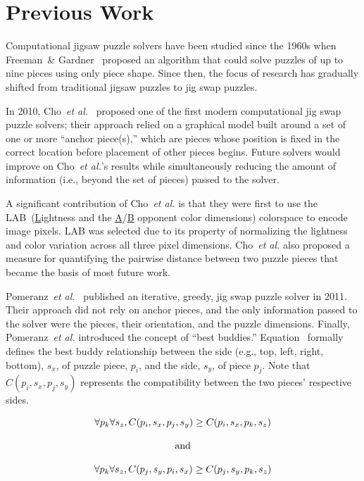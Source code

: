 \chapter{Previous Work}\label{chap:previousWork}

Computational jigsaw puzzle solvers have been studied since the 1960s when Freeman~\& Gardner~\cite{freeman1964} proposed an algorithm that could solve puzzles of up to nine pieces using only piece shape.  Since then, the focus of research has gradually shifted from traditional jigsaw puzzles to jig swap puzzles.  

In 2010, Cho~\textit{et al.}~\cite{cho2010} proposed one of the first modern computational jig swap puzzle solvers; their approach relied on a graphical model built around a set of one or more ``anchor piece(s),'' which are pieces whose position is fixed in the correct location before placement of other pieces begins.  Future solvers would improve on Cho~\textit{et al.}'s results while simultaneously reducing the amount of information (i.e., beyond the set of pieces) passed to the solver.

A significant contribution of Cho~\textit{et al.} is that they were first to use the LAB~(\underline{L}ightness and the \underline{A}/\underline{B} opponent color dimensions) colorspace to encode image pixels.  LAB was selected due to its property of normalizing the lightness and color variation across all three pixel dimensions.  Cho~\textit{et al.} also proposed a measure for quantifying the pairwise distance between two puzzle pieces that became the basis of most future work.  

Pomeranz~\textit{et al.}~\cite{pomeranz2011} published an iterative, greedy, jig swap puzzle solver in 2011.  Their approach did not rely on anchor pieces, and the only information passed to the solver were the pieces, their orientation, and the puzzle dimensions.  Finally, Pomeranz~\textit{et al.} introduced the concept of ``best buddies.'' Equation~ formally defines the best buddy relationship between the side (e.g., top, left, right, bottom), $s_x$, of puzzle piece, $p_i$, and the side, $s_y$, of piece $p_j$.  Note that $C(p_i, s_x, p_j, s_y)$ represents the compatibility between the two pieces' respective sides.

\begin{equation} \label{eq:pomeranzBestBuddyDefinition}
\centering
\begin{split}
	\begin{matrix}
		\forall{p_{k}}\forall{s_z},C(p_i, s_x, p_j, s_y) \geq C(p_i, s_x, p_k, s_z)
		\\
		\\
		\textnormal{and}
		\\
		\\
		\forall{p_{k}}\forall{s_z},C(p_j, s_y, p_i, s_x) \geq C(p_j, s_y, p_k, s_z)
	\end{matrix}
\end{split}
\end{equation} 

